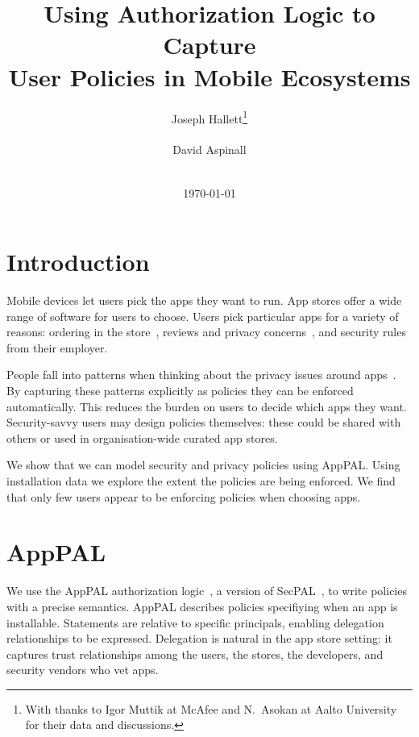 \documentclass[]{soups-poster}
\newcommand{\citep}[1]{\cite{#1}}
\begin{document}
\title{Using Authorization Logic to Capture\\User Policies in Mobile Ecosystems}
\author{%
  \alignauthor{}
  Joseph Hallett\thanks{With thanks to Igor Muttik at McAfee and N{.}~Asokan at Aalto University for their data and discussions.}\\
  \\
  \alignauthor{}
  David Aspinall\\
  \\
}
\date\today
\maketitle

\section{Introduction}

Mobile devices let users pick the apps they want to run.
App stores offer a wide range of software for users to choose.
Users pick particular apps for a variety of reasons:
  ordering in the store~\citep{Prata:2012in}, reviews and privacy concerns~\citep{Kelley:2013kc}, and security rules from their employer.

  People fall into patterns when thinking about the privacy issues around apps~\citep{Sadeh:2014vq}.
By capturing these patterns explicitly as policies they can be enforced automatically.
This reduces the burden on users to decide which apps they want.
Security-savvy users may design policies themselves:
  these could be shared with others or used in organisation-wide curated app stores.

We show that we can model security and privacy policies using AppPAL.
Using installation data we explore the extent the policies are being enforced.
We find that only few users appear to be enforcing policies when choosing apps.

%

\section{AppPAL}

We use the AppPAL authorization logic~\citep{Hallett:2014un}, a version of SecPAL~\citep{Becker:2006vh}, to write policies with a precise semantics.
AppPAL describes policies specifiying when an app is installable.
Statements are relative to specific principals, enabling delegation relationships to be expressed.
Delegation is natural in the app store setting: it captures trust relationships among the users, the stores, the developers, and security vendors who vet apps.
\end{document}
